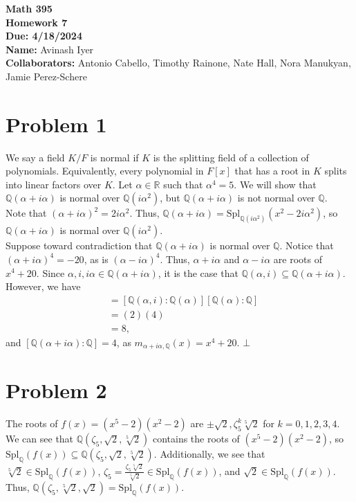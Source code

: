 \documentclass[11pt]{extarticle}
\title{}
\author{}
\date{}
\newcommand{\Q}{\mathbb{Q}}
\newcommand{\R}{\mathbb{R}}
\begin{document}
  \begin{center}
    {\bf \Large Math 395 \\[0.1in]Homework 7 \\[0.1in]
    Due: 4/18/2024}\\[.25in]
    {\bf Name:} {Avinash Iyer}\\[0.15in]
    {\bf Collaborators:} {Antonio Cabello, Timothy Rainone, Nate Hall, Nora Manukyan, Jamie Perez-Schere} \\
  \end{center}
  \section{Problem 1}%
  We say a field $K/F$ is normal if $K$ is the splitting field of a collection of polynomials. Equivalently, every polynomial in $F[x]$ that has a root in $K$ splits into linear factors over $K$. Let $\alpha\in \R$ such that $\alpha^4 = 5$. We will show that $\Q(\alpha + i\alpha)$ is normal over $\Q(i\alpha^2)$, but $\Q(\alpha + i\alpha)$ is not normal over $\Q$.\\

  Note that $(\alpha + i\alpha)^2 = 2i\alpha^2$. Thus, $\Q(\alpha + i\alpha) = \text{Spl}_{\Q(i\alpha^2)}(x^2 - 2i\alpha^2)$, so $\Q(\alpha + i\alpha)$ is normal over $\Q(i\alpha^2)$.\\

  Suppose toward contradiction that $\Q(\alpha + i\alpha)$ is normal over $\Q$. Notice that $(\alpha + i\alpha)^4 = -20$, as is $(\alpha - i\alpha)^4$. Thus, $\alpha + i\alpha$ and $\alpha - i\alpha$ are roots of $x^4 + 20$. Since $\alpha,i,i\alpha\in \Q(\alpha + i\alpha)$, it is the case that $\Q(\alpha,i)\subseteq \Q(\alpha + i\alpha)$. However, we have
  \begin{align*}
    [\Q(\alpha,i):\Q] &= [\Q(\alpha,i):\Q(\alpha)][\Q(\alpha):\Q]\\
                      &= (2)(4)\\
                      &= 8,
  \end{align*}
  and $[\Q(\alpha + i\alpha):\Q] = 4$, as $m_{\alpha + i\alpha,\Q}(x) = x^4 + 20$. $\bot$
  \section{Problem 2}%
  The roots of $f(x) = (x^5 - 2)(x^2 - 2)$ are $\pm\sqrt{2}, \zeta_5^{k}\sqrt[5]{2}$ for $k=0,1,2,3,4$. We can see that $\Q(\zeta_5,\sqrt{2},\sqrt[5]{2})$ contains the roots of $(x^5-2)(x^2-2)$, so $\text{Spl}_{\Q}\left(f(x)\right) \subseteq \Q(\zeta_5,\sqrt{2},\sqrt[5]{2})$. Additionally, we see that $\sqrt[5]{2}\in \text{Spl}_{\Q}\left(f(x)\right)$, $\zeta_5 = \frac{\zeta_5\sqrt[5]{2}}{\sqrt[5]{2}}\in \text{Spl}_{\Q}\left(f(x)\right)$, and $\sqrt{2}\in \text{Spl}_{\Q}\left(f(x)\right)$. Thus, $\Q(\zeta_5,\sqrt[5]{2},\sqrt{2}) = \text{Spl}_{\Q}(f(x))$.\\
\end{document}
